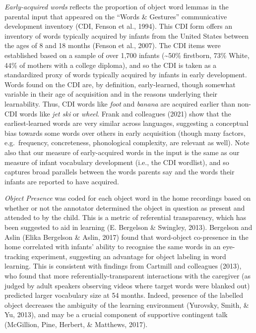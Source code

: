 \documentclass[
  english,
  man,floatsintext]{apa6}
\begin{document}
\emph{Early-acquired words} reflects the proportion of object word lemmas in the parental input that appeared on the ``Words \& Gestures'' communicative development inventory (CDI, Fenson et al., 1994). This CDI form offers an inventory of words typically acquired by infants from the United States between the ages of 8 and 18 months (Fenson et al., 2007). The CDI items were established based on a sample of over 1,700 infants (\textasciitilde50\% firstborn, 73\% White, 44\% of mothers with a college diploma), and so the CDI is taken as a standardized proxy of words typically acquired by infants in early development. Words found on the CDI are, by definition, early-learned, though somewhat variable in their age of acquisition and in the reasons underlying their learnability. Thus, CDI words like \emph{foot} and \emph{banana} are acquired earlier than non-CDI words like \emph{jet ski} or \emph{wheel}. Frank and colleagues (2021) show that the earliest-learned words are very similar across languages, suggesting a conceptual bias towards some words over others in early acquisition (though many factors, e.g.~frequency, concreteness, phonological complexity, are relevant as well). Note also that our measure of early-acquired words in the input is the same as our measure of infant vocabulary development (i.e., the CDI wordlist), and so captures broad parallels between the words parents say and the words their infants are reported to have acquired.

\emph{Object Presence} was coded for each object word in the home recordings based on whether or not the annotator determined the object in question as present and attended to by the child. This is a metric of referential transparency, which has been suggested to aid in learning (E. Bergelson \& Swingley, 2013). Bergelson and Aslin (Elika Bergelson \& Aslin, 2017) found that word-object co-presence in the home correlated with infants' ability to recognise the same words in an eye-tracking experiment, suggesting an advantage for object labeling in word learning. This is consistent with findings from Cartmill and colleagues (2013), who found that more referentially-transparent interactions with the caregiver (as judged by adult speakers observing videos where target words were blanked out) predicted larger vocabulary size at 54 months. Indeed, presence of the labelled object decreases the ambiguity of the learning environment (Yurovsky, Smith, \& Yu, 2013), and may be a crucial component of supportive contingent talk (McGillion, Pine, Herbert, \& Matthews, 2017).
\end{document}
